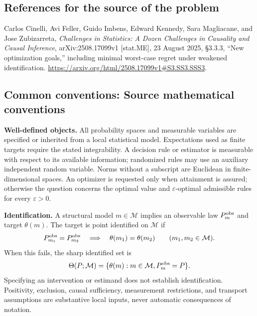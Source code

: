 \documentclass[11pt,a4paper]{article}
\begin{document}
\subsection*{References for the source of the problem}
Carlos Cinelli, Avi Feller, Guido Imbens, Edward Kennedy, Sara Magliacane, and Jose Zubizarreta, \emph{Challenges in Statistics: A Dozen Challenges in Causality and Causal Inference}, arXiv:2508.17099v1 [stat.ME], 23 August 2025, \S3.3.3, ``New optimization goals,'' including minimal worst-case regret under weakened identification. \url{https://arxiv.org/html/2508.17099v1#S3.SS3.SSS3}.

\subsection*{Common conventions: Source mathematical conventions}

\textbf{Well-defined objects.}
All probability spaces and measurable variables are specified or inherited
from a local statistical model. Expectations used as finite targets require
the stated integrability. A decision rule or estimator is measurable with
respect to its available information; randomized rules may use an auxiliary
independent random variable. Norms without a subscript are Euclidean in
finite-dimensional spaces. An optimizer is requested only when attainment
is assured; otherwise the question concerns the optimal value and
$\varepsilon$-optimal admissible rules for every $\varepsilon>0$.

\textbf{Identification.}
A structural model $m\in\mathcal M$ implies an observable law
$P_m^{\rm obs}$ and target $\theta(m)$. The target is point identified on
$\mathcal M$ if
\[
 P_{m_1}^{\rm obs}=P_{m_2}^{\rm obs}
 \quad\Longrightarrow\quad\theta(m_1)=\theta(m_2)
 \qquad(m_1,m_2\in\mathcal M).
\]
When this fails, the sharp identified set is
\[
 \Theta(P;\mathcal M)=\{\theta(m):m\in\mathcal M,
                                  P_m^{\rm obs}=P\}.
\]
Specifying an intervention or estimand does not establish identification.
Positivity, exclusion, causal sufficiency, measurement restrictions, and
transport assumptions are substantive local inputs, never automatic
consequences of notation.
\end{document}
